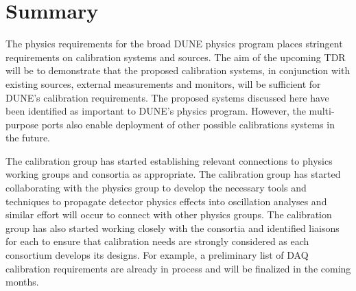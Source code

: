 \section{Summary} %
\label{sec:calibsum}

The physics requirements for the broad DUNE physics program places stringent requirements on calibration systems and sources. The aim of the upcoming TDR will be to demonstrate that the proposed calibration systems, in conjunction with existing sources, external measurements and monitors, will be sufficient for DUNE's calibration requirements. The proposed systems discussed here have been identified as important to DUNE's physics program. However, the multi-purpose ports also enable deployment of other possible calibrations systems in the future.

The calibration group has started establishing relevant connections to physics working groups and consortia as appropriate. The calibration group has started collaborating with the \lbl physics group to develop the necessary tools and techniques to propagate detector physics effects into oscillation analyses and similar effort will occur to connect with other physics groups. The calibration group has also started working closely with the consortia and identified liaisons for each 
to ensure that calibration needs are strongly considered as each consortium develops its designs. For example, a preliminary list of DAQ calibration requirements are already in process and  will be finalized in the coming months.





